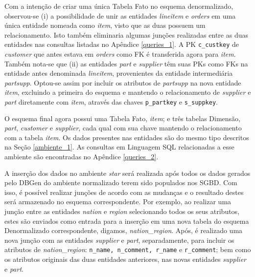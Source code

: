 Com a intenção de criar uma única Tabela Fato no esquema denormalizado, observou-se (i) a possibilidade de unir as entidades \textit{lineitem} e \textit{orders} em uma única entidade nomeada como \textit{item}, visto que as duas possuem um relacionamento. Isto também eliminaria algumas junções realizadas entre as duas entidades nas consultas listadas no Apêndice \ref{queries_1}. A PK \texttt{c\_custkey} de \textit{customer} que antes estava em \textit{orders} como FK é transferida agora para \textit{item}. Também nota-se que (ii) as entidades \textit{part} e \textit{supplier} têm suas PKs como FKs na entidade antes denominada \textit{lineitem}, provenientes da entidade intermediária \textit{partsupp}. Optou-se assim por incluir os atributos de \textit{partsupp} na nova entidade \textit{item}, excluindo a primeira do esquema e mantendo o relacionamento de \textit{supplier} e \textit{part} diretamente com \textit{item}, através das chaves \texttt{p\_partkey} e \texttt{s\_suppkey}.

O esquema final agora possui uma Tabela Fato, \textit{item}; e três tabelas Dimensão, \textit{part}, \textit{customer} e \textit{supplier}, cada qual com sua chave mantendo o relacionamento com a tabela \textit{item}. Os dados presentes nas entidades são do mesmo tipo descritos na Seção \ref{ambiente_1}. As consultas em Linguagem SQL relacionadas a esse ambiente são encontradas no Apêndice \ref{queries_2}.

A inserção dos dados no ambiente \textit{star} será realizada após todos os dados gerados pelo DBGen do ambiente normalizado terem sido populados nos SGBD. Com isso, é possível realizar junções de acordo com as mudanças e o resultado destes será armazenado no esquema correspondente. Por exemplo, ao realizar uma junção entre as entidades \textit{nation} e \textit{region} selecionando todos os seus atributos, estes são enviados como entrada para a inserção em uma nova tabela do esquema Denormalizado correspondente, digamos, \textit{nation\_region}. Após, é realizado uma nova junção com as entidades \textit{supplier} e \textit{part}, separadamente, para incluir os atributos de \textit{nation\_region}: \texttt{n\_name, n\_comment, r\_name} e \texttt{r\_comment}; bem como os atributos originais das duas entidades anteriores, nas novas entidades \textit{supplier} e \textit{part}.